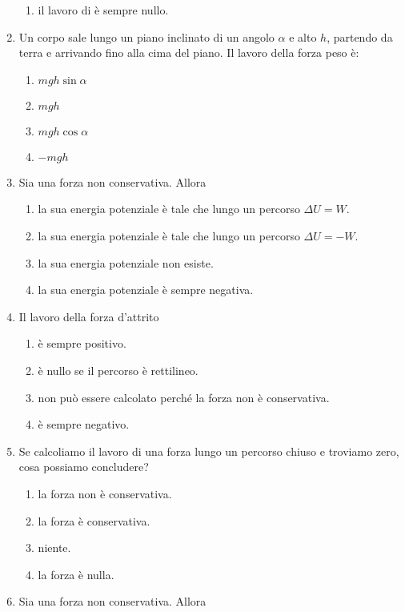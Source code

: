 \documentclass{article}
\begin{document}
\begin{enumerate}
\begin{enumerate}[label=\Alph*.]
    \item il lavoro di  è sempre nullo.
  \end{enumerate}
  \item Un corpo sale lungo un piano inclinato di un angolo $\alpha$ e alto $h$, partendo da terra e arrivando fino alla cima del piano. Il lavoro della forza peso è:
  \begin{enumerate}[label=\Alph*.]
    \item $mgh\sin\alpha$
    \item $mgh$
    \item $mgh\cos\alpha$
    \item $-mgh$
  \end{enumerate}
  \item Sia  una forza non conservativa. Allora
  \begin{enumerate}[label=\Alph*.]
    \item la sua energia potenziale è tale che lungo un percorso $\Delta U=W$.
    \item la sua energia potenziale è tale che lungo un percorso $\Delta U=-W$.
    \item la sua energia potenziale non esiste.
    \item la sua energia potenziale è sempre negativa.
  \end{enumerate}
  \item Il lavoro della forza d'attrito
  \begin{enumerate}[label=\Alph*.]
    \item è sempre positivo.
    \item è nullo se il percorso è rettilineo.
    \item non può essere calcolato perché la forza non è conservativa.
    \item è sempre negativo.
  \end{enumerate}
  \item Se calcoliamo il lavoro di una forza lungo un percorso chiuso e troviamo zero, cosa possiamo concludere?
  \begin{enumerate}[label=\Alph*.]
    \item la forza non è conservativa.
    \item la forza è conservativa.
    \item niente.
    \item la forza è nulla.
  \end{enumerate}
  \item Sia  una forza non conservativa. Allora
  \begin{enumerate}[label=\Alph*.]

\end{enumerate}
\end{enumerate}
\end{document}
